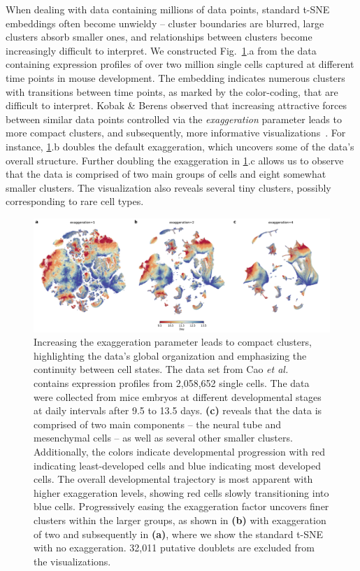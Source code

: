 \documentclass[twocolumn]{article}
\begin{document}
When dealing with data containing millions of data points, standard t-SNE
embeddings often become unwieldy -- cluster boundaries are blurred, large
clusters absorb smaller ones, and relationships between clusters become
increasingly difficult to interpret. We constructed Fig.~\ref{fig:cao}.a from
the data containing expression profiles of over two million single cells
captured at different time points in mouse development. The embedding indicates
numerous clusters with transitions between time points, as marked by the
color-coding, that are difficult to interpret. Kobak \& Berens observed that
increasing attractive forces between similar data points controlled via the
\textit{exaggeration} parameter leads to more compact clusters, and
subsequently, more informative visualizations~\cite{kobak2019art}. For instance,
\ref{fig:cao}.b doubles the default exaggeration, which uncovers some of the
data's overall structure. Further doubling the exaggeration in \ref{fig:cao}.c
allows us to observe that the data is comprised of two main groups of cells and
eight somewhat smaller clusters. The visualization also reveals several tiny
clusters, possibly corresponding to
rare cell types.

\begin{figure}[htbp]
  \includegraphics[width=\textwidth]{cao2019}
  \caption{\label{fig:cao}
Increasing the exaggeration parameter leads to compact clusters, highlighting
	the data's global organization and emphasizing the continuity between
	cell states. The data set from Cao \textit{et al.}~\cite{cao2019single}
	contains expression profiles from 2,058,652 single cells. The data were
	collected from mice embryos at different developmental stages at daily
	intervals after 9.5 to 13.5 days. \textbf{(c)} reveals that the data is
	comprised of two main components -- the neural tube and mesenchymal
	cells -- as well as several other smaller clusters. Additionally, the
	colors indicate developmental progression with red indicating
	least-developed cells and blue indicating most developed cells. The
	overall developmental trajectory is most apparent with higher
	exaggeration levels, showing red cells slowly transitioning into blue
	cells. Progressively easing the exaggeration factor uncovers finer
	clusters within the larger groups, as shown in \textbf{(b)} with
	exaggeration of two and subsequently in \textbf{(a)}, where we show the
	standard t-SNE with no exaggeration. 32,011 putative doublets are
	excluded from the visualizations.
}
\end{figure}
\end{document}
